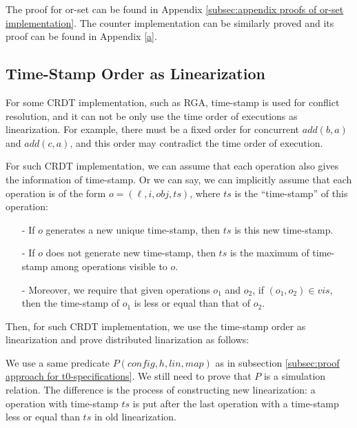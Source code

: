 The proof for or-set can be found in Appendix \ref{subsec:appendix proofs of or-set implementation}. The counter implementation can be similarly proved and its proof can be found in Appendix \ref{a}.




\subsection{Time-Stamp Order as Linearization}
\label{subsec:time-stamp order as linearizabtion}

For some CRDT implementation, such as RGA, time-stamp is used for conflict resolution, and it can not be only use the time order of executions as linearization. For example, there must be a fixed order for concurrent $\mathit{add}(b,a)$ and $\mathit{add}(c,a)$, and this order may contradict the time order of execution.

For such CRDT implementation, we can assume that each operation also gives the information of time-stamp. Or we can say, we can implicitly assume that each operation is of the form $o = (\ell,i,\mathit{obj},\mathit{ts})$, where $\mathit{ts}$ is the ``time-stamp'' of this operation:

\begin{itemize}
\setlength{\itemsep}{0.5pt}
\item[-] If $o$ generates a new unique time-stamp, then $\mathit{ts}$ is this new time-stamp.

\item[-] If $o$ does not generate new time-stamp, then $\mathit{ts}$ is the maximum of time-stamp among operations visible to $o$.

\item[-] Moreover, we require that given operations $o_1$ and $o_2$, if $(o_1,o_2) \in \mathit{vis}$, then the time-stamp of $o_1$ is less or equal than that of $o_2$.
\end{itemize}

Then, for such CRDT implementation, we use the time-stamp order as linearization and prove distributed linarization as follows:

We use a same predicate $P(\mathit{config},h,\mathit{lin},\mathit{map})$ as in subsection \ref{subsec:proof approach for t0-specifications}. We still need to prove that $P$ is a simulation relation. The difference is the process of constructing new linearization: a operation with time-stamp $\mathit{ts}$ is put after the last operation with a time-stamp less or equal than $\mathit{ts}$ in old linearization.

